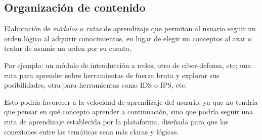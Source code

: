         \subsection{Organización de contenido}
        
            Elaboración de \textit{módulos} o \textit{rutas} de aprendizaje que permitan al usuario seguir un orden lógico al adquirir conocimientos, en lugar de elegir un conceptos al azar o tratar de asumir un orden por su cuenta.

            Por ejemplo: un módulo de introducción a redes, otro de ciber-defensa, etc; una ruta para aprender sobre herramientas de fuerza bruta y explorar sus posibilidades, otra para herramientas como IDS o IPS, etc.

            Esto podría favorecer a la velocidad de aprendizaje del usuario, ya que no tendría que pensar en qué concepto aprender a continuación, sino que podría seguir una ruta de aprendizaje establecida por la plataforma, diseñada para que las conexiones entre las temáticas sean más claras y lógicas.

            \cleardoublepage
